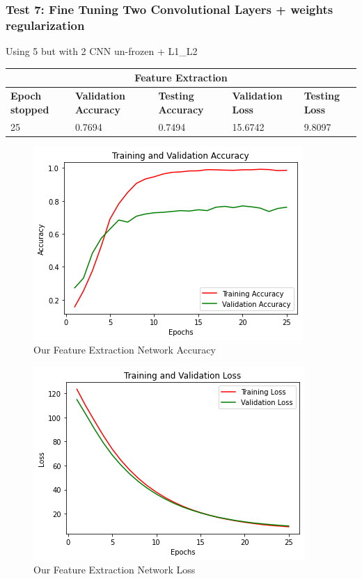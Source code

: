 \subsubsection{Test 7: Fine Tuning Two Convolutional Layers + weights regularization}
Using 5 but with 2 CNN un-frozen + L1\_L2

 \medskip

\begin{tabular}{ |p{2cm}|p{2cm}|p{2cm}|p{2cm}|p{2cm}|  }
\hline
\multicolumn{5}{|c|}{Feature Extraction} \\
\hline
\textbf{Epoch stopped} & \textbf{Validation Accuracy} & \textbf{Testing Accuracy} & \textbf{Validation Loss} & \textbf{Testing Loss} \\
\hline
25 & 0.7694 & 0.7494 & 15.6742 & 9.8097\\
\hline
\end{tabular}

\medskip

\begin{figure}[H]
	\centering
	\includegraphics[height=0.45\textwidth]{img/vgg16/vgg16ft2dropregacc.png}
	\caption{Our Feature Extraction Network Accuracy}
	\label{fig:vgg16ft2dropregacc}
\end{figure}

\begin{figure}[H]
	\centering
	\includegraphics[height=0.45\textwidth]{img/vgg16/vgg16ft2dropregloss.png}
	\caption{Our Feature Extraction Network Loss}
	\label{fig:vgg16ft2dropregloss}
\end{figure}









